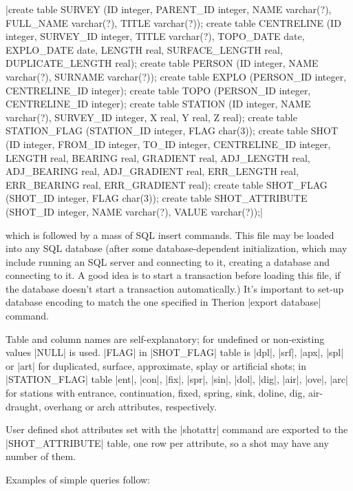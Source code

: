 |create table SURVEY (ID integer, PARENT_ID integer,
  NAME varchar(?), FULL_NAME varchar(?), TITLE varchar(?));
create table CENTRELINE (ID integer, SURVEY_ID integer,
  TITLE varchar(?), TOPO_DATE date, EXPLO_DATE date,
  LENGTH real, SURFACE_LENGTH real, DUPLICATE_LENGTH real);
create table PERSON (ID integer, NAME varchar(?), SURNAME varchar(?));
create table EXPLO (PERSON_ID integer, CENTRELINE_ID integer);
create table TOPO (PERSON_ID integer, CENTRELINE_ID integer);
create table STATION (ID integer, NAME varchar(?),
  SURVEY_ID integer, X real, Y real, Z real);
create table STATION_FLAG (STATION_ID integer, FLAG char(3));
create table SHOT (ID integer, FROM_ID integer, TO_ID integer,
  CENTRELINE_ID integer, LENGTH real, BEARING real, GRADIENT real,
  ADJ_LENGTH real, ADJ_BEARING real, ADJ_GRADIENT real,
  ERR_LENGTH real, ERR_BEARING real, ERR_GRADIENT real);
create table SHOT_FLAG (SHOT_ID integer, FLAG char(3));
create table SHOT_ATTRIBUTE (SHOT_ID integer,
  NAME varchar(?), VALUE varchar(?));|

which is followed by a mass of SQL insert commands. This file may be loaded
into any SQL database (after some database-dependent initialization, which may
include running an SQL server and connecting to it, creating a database and
connecting to it. A good idea is to start a transaction before loading this
file, if the database doesn't start a transaction automatically.)
It's important to set-up database encoding to match the one
specified in Therion |export database| command.

\iffulloutput
\midinsert
    \centerline{}%
\endinsert
\fi

Table and column names are self-explanatory; for undefined or non-existing
values |NULL| is used. |FLAG| in |SHOT_FLAG| table is |dpl|, |srf|, |apx|, |spl|
or |art| for duplicated, surface, approximate, splay or artificial shots; in |STATION_FLAG| table |ent|, |con|, |fix|,
|spr|, |sin|, |dol|, |dig|, |air|, |ove|, |arc| for stations
with entrance, continuation, fixed, spring, sink, doline, dig, air-draught,
overhang or arch attributes, respectively.

User defined shot attributes set with the |shotattr| command are
exported to the |SHOT_ATTRIBUTE| table, one row per attribute, so a shot may
have any number of them.

Examples of simple queries follow:


